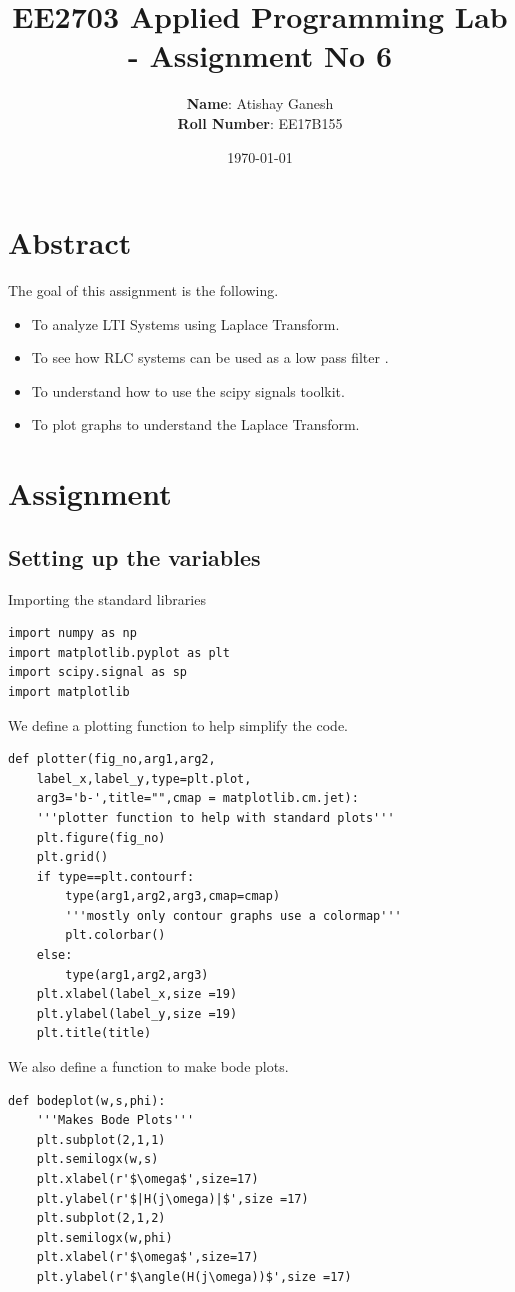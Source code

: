 \documentclass[11pt, a4paper]{article}
\title{EE2703 Applied Programming Lab - Assignment No 6}
\author{
  \textbf{Name}: Atishay Ganesh\\
  \textbf{Roll Number}: EE17B155
}\date{\today}
\begin{document}
		
\maketitle 
\section{Abstract}
The goal of this assignment is the following.
\begin{itemize}
\item To analyze LTI Systems using Laplace Transform.
\item To see how RLC systems can be used as a low pass filter .
\item To understand how to use the scipy signals toolkit.
\item To plot graphs to understand the Laplace Transform.
\end{itemize}

\section{Assignment}
\subsection{Setting up the variables}
Importing the standard libraries
\begin{verbatim}
import numpy as np
import matplotlib.pyplot as plt
import scipy.signal as sp
import matplotlib
\end{verbatim}
We define a plotting function to help simplify the code.
\begin{verbatim}
def plotter(fig_no,arg1,arg2,
    label_x,label_y,type=plt.plot,
    arg3='b-',title="",cmap = matplotlib.cm.jet):
    '''plotter function to help with standard plots'''
    plt.figure(fig_no)
    plt.grid()
    if type==plt.contourf:
        type(arg1,arg2,arg3,cmap=cmap)
        '''mostly only contour graphs use a colormap'''
        plt.colorbar()
    else:
        type(arg1,arg2,arg3)
    plt.xlabel(label_x,size =19)
    plt.ylabel(label_y,size =19)
    plt.title(title)
\end{verbatim}
We also define a function to make bode plots.
\begin{verbatim}
def bodeplot(w,s,phi):
    '''Makes Bode Plots'''
    plt.subplot(2,1,1)
    plt.semilogx(w,s)
    plt.xlabel(r'$\omega$',size=17)
    plt.ylabel(r'$|H(j\omega)|$',size =17)
    plt.subplot(2,1,2)
    plt.semilogx(w,phi)
    plt.xlabel(r'$\omega$',size=17)
    plt.ylabel(r'$\angle(H(j\omega))$',size =17)
\end{verbatim}
\end{document}
